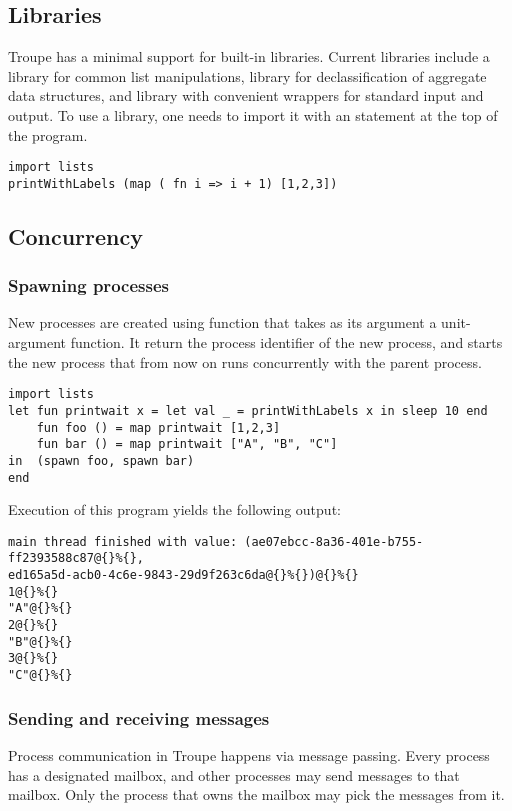 \subsection{Libraries}
\label{sec:labels}
Troupe has a minimal support for built-in libraries. Current libraries include a library  for common list manipulations, library   for declassification of aggregate data structures, and library
 with convenient wrappers for standard input and output. To use a library, one needs to import it with an  statement at the top of the program.
\begin{lstlisting}
import lists 
printWithLabels (map ( fn i => i + 1) [1,2,3])
\end{lstlisting}



\subsection{Concurrency} 
\label{sec:concurrency}
\subsubsection{Spawning processes}
New processes are created using  function that takes as its argument a unit-argument function. 
It return the process identifier of the new process, and starts the new process that from now on runs concurrently with the 
parent process.
\begin{lstlisting}
import lists
let fun printwait x = let val _ = printWithLabels x in sleep 10 end
    fun foo () = map printwait [1,2,3]
    fun bar () = map printwait ["A", "B", "C"]
in  (spawn foo, spawn bar)
end
\end{lstlisting}
Execution of this program yields the following output:
\begin{verbatim}
main thread finished with value: (ae07ebcc-8a36-401e-b755-ff2393588c87@{}%{}, 
ed165a5d-acb0-4c6e-9843-29d9f263c6da@{}%{})@{}%{}
1@{}%{}
"A"@{}%{}
2@{}%{}
"B"@{}%{}
3@{}%{}
"C"@{}%{}
\end{verbatim}

\subsubsection{Sending and receiving messages}
Process communication in Troupe happens via message passing.  Every process has a designated mailbox,
and other processes may send messages to that mailbox. Only the process that owns the mailbox may pick the messages from it.


